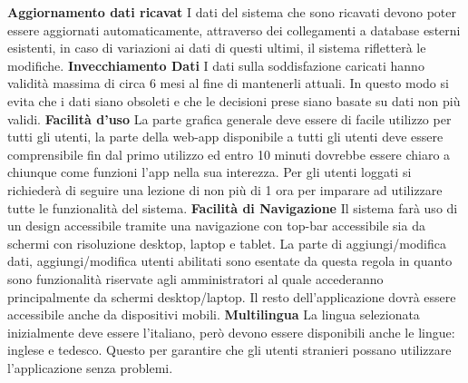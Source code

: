 \begin{rnfList}
        \rnfItem \textbf{Aggiornamento dati ricavat} I dati del sistema che sono ricavati devono poter essere aggiornati automaticamente, attraverso dei collegamenti a database esterni esistenti, in caso di variazioni ai dati di questi ultimi, il sistema rifletterà le modifiche.
        \rnfItem \textbf{Invecchiamento Dati} I dati sulla soddisfazione caricati hanno validità massima di circa 6 mesi al fine di mantenerli attuali. In questo modo si evita che i dati siano obsoleti e che le decisioni prese siano basate su dati non più validi.
        \rnfItem \textbf{Facilità d'uso} La parte grafica generale deve essere di facile utilizzo per tutti gli utenti, la parte della web-app disponibile a tutti gli utenti deve essere comprensibile fin dal primo utilizzo ed entro 10 minuti dovrebbe essere chiaro a chiunque come funzioni l'app nella sua interezza. Per gli utenti loggati si richiederà di seguire una lezione di non più di 1 ora per imparare ad utilizzare tutte le funzionalità del sistema.
        \rnfItem \textbf{Facilità di Navigazione} Il sistema farà uso di un design accessibile tramite una navigazione con top-bar accessibile sia da schermi con risoluzione desktop, laptop e tablet. La parte di aggiungi/modifica dati, aggiungi/modifica utenti abilitati sono esentate da questa regola in quanto sono funzionalità riservate agli amministratori al quale accederanno principalmente da schermi desktop/laptop. Il resto dell'applicazione dovrà essere accessibile anche da dispositivi mobili.
        \rnfItem \textbf{Multilingua} La lingua selezionata inizialmente deve essere l'italiano, però devono essere disponibili anche le lingue: inglese e tedesco. Questo per garantire che gli utenti stranieri possano utilizzare l'applicazione senza problemi.
    \end{rnfList}